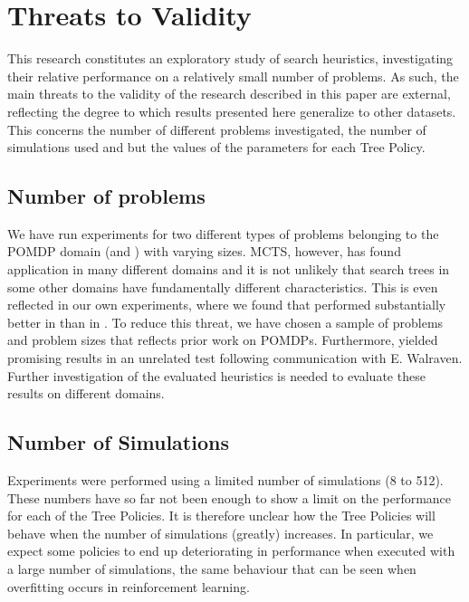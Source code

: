 \section{Threats to Validity}
This research constitutes an exploratory study of search heuristics, investigating their relative performance on a relatively small number of problems. As such, the main threats to the validity of the research described in this paper are external, reflecting the degree to which results presented here generalize to other datasets. This concerns the number of different problems investigated, the number of simulations used  and but the values of the parameters for each Tree Policy.

\subsection{Number of problems}
We have run experiments for two different types of problems belonging to the POMDP domain (\rock and \poc) with varying sizes. MCTS, however, has found application in many different domains and it is not unlikely that search trees in some other domains have fundamentally different characteristics. This is even reflected in our own experiments, where we found that \eroulette performed substantially better in \rock than in \poc. To reduce this threat, we have chosen a sample of problems and problem sizes that reflects prior work on POMDPs. Furthermore, \rsoft yielded promising results in an unrelated test following communication with E. Walraven. Further investigation of the evaluated heuristics is needed to evaluate these results on different domains.

\subsection{Number of Simulations}
Experiments were performed using a limited number of simulations (8 to 512). These numbers have so far not been enough to show a limit on the performance for each of the Tree Policies. It is therefore unclear how the Tree Policies will behave when the number of simulations (greatly) increases. In particular, we expect some policies to end up deteriorating in performance when executed with a large number of simulations, the same behaviour that can be seen when overfitting occurs in reinforcement learning.

